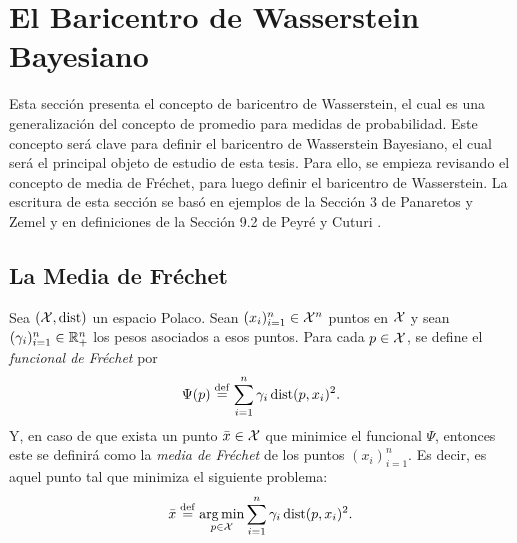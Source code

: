 \section{El Baricentro de Wasserstein Bayesiano}\label{sec:el-baricentro-de-Wasserstein-Bayesiano}  %


Esta sección presenta el concepto de baricentro de Wasserstein, el cual es una generalización del concepto de promedio para medidas de probabilidad. Este concepto será clave para definir el baricentro de Wasserstein Bayesiano, el cual será el principal objeto de estudio de esta tesis. Para ello, se empieza revisando el concepto de media de Fréchet, para luego definir el baricentro de Wasserstein. La escritura de esta sección se basó en ejemplos de la Sección 3 de Panaretos y Zemel \cite{panaretos2020invitation} y en definiciones de la Sección 9.2 de Peyré y Cuturi \cite{peyre2019computational}.

\subsection{La Media de Fréchet}\label{ssec:la-media-de-Frechet}  %

\begin{definition}
	Sea $(\mathcal{X}, \operatorname{dist})$ un espacio Polaco. Sean $(x_{i})_{i=1}^{n}\in\mathcal{X}^n$ puntos en $\mathcal{X}$ y sean $(\gamma_{i})_{i=1}^{n}\in\mathbb{R}_+^n$ los pesos asociados a esos puntos. Para cada $p\in\mathcal{X}$, se define el \emph{funcional de Fréchet} por
	\begin{equation}
		\label{eq:funcionalFrechet}
		\Psi(p) \stackrel{\mathrm{def}}{=} \sum_{i=1}^{n} \gamma_i \operatorname{dist}(p, x_i)^2.
	\end{equation}
	Y, en caso de que exista un punto $\bar x \in \mathcal{X}$ que minimice el funcional $\Psi$, entonces este se definirá como la \emph{media de Fréchet} de los puntos $(x_{i})_{i=1}^{n}$. Es decir, es aquel punto tal que minimiza el siguiente problema:
	\begin{equation}
		\label{eq:mediaFrechet}
		\bar x \stackrel{\mathrm{def}}{=} \operatorname*{arg\,m{i}n}_{p \in \mathcal{X}} \sum_{i=1}^{n} \gamma_i \operatorname{dist}(p, x_i)^2.
	\end{equation}
\end{definition}

